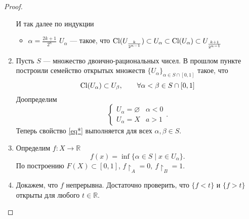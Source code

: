 \documentclass[11pt]{book}
\newcommand{\R}{\mathbb{R}}
\newcommand{\Cl}{{\mathop{\text{\rm Cl}}}}
\theoremstyle{definition}
\theoremstyle{plain}
\theoremstyle{plain}
\theoremstyle{definition}
\theoremstyle{remark}
\begin{document}
\begin{proof}
\begin{enumerate}[label=\roman*. ~]
\begin{itemize}[label=$\blacktriangleright$ ]
	    \end{itemize}
	    И так далее по индукции
	    \begin{itemize}[label=$\blacktriangleright$ ]
		\item $ \alpha= \frac{2k + 1}{2^{n}}$ 
		    $U_{\alpha}$ --- такое, что  $ \Cl(U_{\frac{k}{2^{n-1}}}) \subset U_{\alpha} \subset  \Cl(U_{\alpha}) \subset U_{\frac{k+1}{2^{n-1}}}$
	    \end{itemize}
	\item Пусть $ S$ --- множество двоично-рациональных чисел.
	    В прошлом пункте построили семейство открытых множеств  $ \{U_{\alpha}\}_{\alpha \in S \cap [0, 1]}$ такое, что 
	    \begin{equation}\label{eq*}
		\Cl (U_{\alpha}) \subset U_{\beta}, \qquad \forall \alpha<\beta \in S\cap [0, 1]
	    \end{equation}
	    Доопределим
	    \[
	    \begin{cases}
		U_{\alpha} = \varnothing & \alpha < 0 \\
		U_{\alpha} = X & a > 1
	    \end{cases}
	    .\] 
	    Теперь свойство \ref{eq*}  выполняется для всех $ \alpha, \beta \in S$.
	\item Определим $ f: X \to  \R$
	    \[
		f(x) = \inf \{\alpha \in S \mid x \in U_{\alpha}\}
	    .\] 
	    По построению $ F(X) \subset [0, 1]$, $ f\!\!\upharpoonright_A = 0, ~ f\!\!\upharpoonright_B = 1$.
	\item Докажем, что  $ f$ непрерывна.
	    Достаточно проверить, что  $ \{f < t\} \text{ и } \{f > t\}$ открыты для любого $ t \in \R$.
\end{enumerate}
\end{proof}
\end{document}
